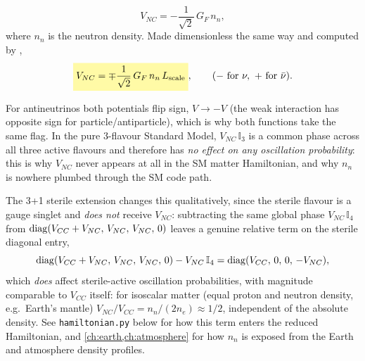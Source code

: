 \begin{theorybox}
\begin{itemize}
    \begin{equation}
      V_{NC} = -\frac{1}{\sqrt2}\,G_F\,n_n,
    \end{equation}
    where $n_n$ is the neutron density. Made dimensionless the same way and
    computed by ,
    \begin{equation}
      \keyresult{V_{NC} = \mp\frac{1}{\sqrt2}\,G_F\,n_n\,L_{\rm scale}}, \qquad (-\text{ for } \nu,\ +\text{ for } \bar\nu).
    \end{equation}
\end{itemize}
For antineutrinos both potentials flip sign, $V \to -V$ (the weak
interaction has opposite sign for particle/antiparticle), which is why both
functions take the same  flag. In the pure 3-flavour
Standard Model, $V_{NC}\,\mathbb{I}_3$ is a common phase across all three
active flavours and therefore has \emph{no effect on any oscillation
probability}: this is why $V_{NC}$ never appears at all in the SM matter
Hamiltonian, and why $n_n$ is nowhere plumbed through the SM code path. 

The 3+1 sterile extension changes this qualitatively, since the sterile flavour
is a gauge singlet and \emph{does not} receive $V_{NC}$: subtracting the
same global phase $V_{NC}\,\mathbb{I}_4$ from
$\operatorname{diag}(V_{CC}+V_{NC},\,V_{NC},\,V_{NC},\,0)$ leaves a genuine relative term
on the sterile diagonal entry,
\begin{equation}
  \operatorname{diag}(V_{CC}+V_{NC},\,V_{NC},\,V_{NC},\,0) - V_{NC}\,\mathbb{I}_4
  = \operatorname{diag}(V_{CC},\,0,\,0,\,-V_{NC}),
\end{equation}
which \emph{does} affect sterile-active oscillation probabilities, with
magnitude comparable to $V_{CC}$ itself: for isoscalar matter (equal proton
and neutron density, e.g.\ Earth's mantle) $V_{NC}/V_{CC}=n_n/(2n_e)
\approx1/2$, independent of the absolute density. See
\texttt{hamiltonian.py} below for how this term enters the reduced
Hamiltonian, and \cref{ch:earth,ch:atmosphere} for how $n_n$ is exposed from
the Earth and atmosphere density profiles.
\end{theorybox}

